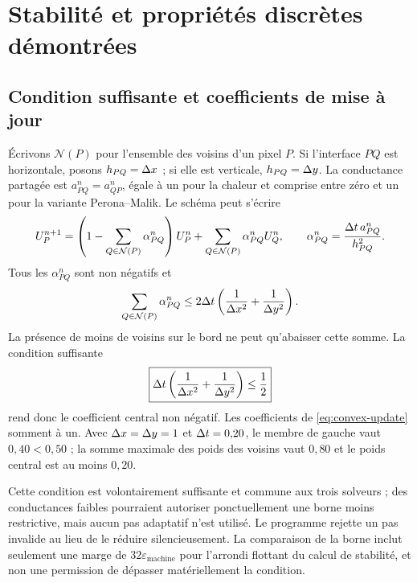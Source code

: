 \section{Stabilité et propriétés discrètes démontrées}
\label{sec:discrete-properties}

\subsection{Condition suffisante et coefficients de mise à jour}

Écrivons $\mathcal N(P)$ pour l'ensemble des voisins d'un pixel $P$.
Si l'interface $PQ$ est horizontale, posons $h_{PQ}=\Delta x$ ; si elle
est verticale, $h_{PQ}=\Delta y$. La conductance partagée est
$a^n_{PQ}=a^n_{QP}$, égale à un pour la chaleur et comprise entre zéro
et un pour la variante Perona--Malik. Le schéma peut s'écrire
\begin{equation}
 U^{n+1}_P=
 \left(1-\sum_{Q\in\mathcal N(P)}\alpha^n_{PQ}\right)U^n_P
 +\sum_{Q\in\mathcal N(P)}\alpha^n_{PQ}U^n_Q,
 \qquad
 \alpha^n_{PQ}=\frac{\Delta t\,a^n_{PQ}}{h_{PQ}^2}.
 \label{eq:convex-update}
\end{equation}
Tous les $\alpha^n_{PQ}$ sont non négatifs et
\begin{equation}
 \sum_{Q\in\mathcal N(P)}\alpha^n_{PQ}
 \leq 2\Delta t\left(\frac1{\Delta x^2}+\frac1{\Delta y^2}\right).
 \label{eq:weight-bound}
\end{equation}
La présence de moins de voisins sur le bord ne peut qu'abaisser cette
somme. La condition suffisante
\begin{equation}
 \boxed{\Delta t\left(\frac1{\Delta x^2}+\frac1{\Delta y^2}\right)\leq\frac12}
 \label{eq:cfl}
\end{equation}
rend donc le coefficient central non négatif. Les coefficients de
\eqref{eq:convex-update} somment à un. Avec $\Delta x=\Delta y=1$ et
$\Delta t=0{,}20$, le membre de gauche vaut $0{,}40<0{,}50$ ; la somme
maximale des poids des voisins vaut $0{,}80$ et le poids central
est au moins $0{,}20$.

Cette condition est volontairement suffisante et commune aux trois
solveurs ; des conductances faibles pourraient autoriser ponctuellement
une borne moins restrictive, mais aucun pas adaptatif n'est utilisé.
Le programme rejette un pas invalide au lieu de le réduire silencieusement.
La comparaison de la borne inclut seulement une marge de
$32\varepsilon_{\mathrm{machine}}$ pour l'arrondi flottant du calcul
de stabilité, et non une permission de dépasser matériellement la
condition.

